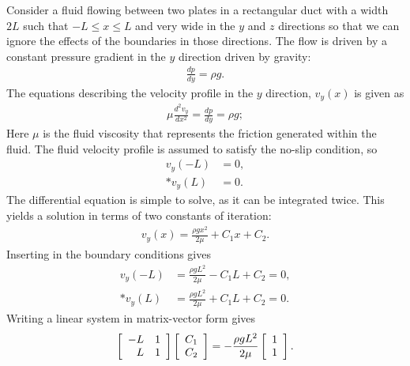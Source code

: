 Consider a fluid flowing between two plates in a rectangular duct with a width $2L$ such that $-L \le x \le L$ and very wide in the $y$ and $z$ directions so that we can ignore the effects of the boundaries in those directions. The flow is driven by a constant pressure gradient in the $y$ direction driven by gravity:
\begin{align}
  \frac{dp}{dy} = \rho g.
\end{align}
The equations describing the velocity profile in the $y$ direction, $v_y(x)$ is given as
\begin{align}
  \mu \frac{d^2 v_y}{dx^2} = \frac{dp}{dy} = \rho g;
\end{align}
Here $\mu$ is the fluid viscosity that represents the friction generated within the fluid. The fluid velocity profile is assumed to satisfy the no-slip condition, so
\begin{subequations}
\begin{align}
  v_y(-L) &= 0, \\*
  v_y(L) &= 0.
\end{align}
\end{subequations}
The differential equation is simple to solve, as it can be integrated twice. This yields a solution in terms of two constants of iteration:
\begin{align}
  v_y(x) = \frac{\rho g x^2}{2 \mu} + C_1 x + C_2.
\end{align}
Inserting in the boundary conditions gives
\begin{subequations}
\begin{align}
  v_y(-L) &= \frac{\rho g L^2}{2 \mu}  - C_1 L + C_2 = 0, \\*
  v_y(L)  &= \frac{\rho g L^2}{2 \mu} + C_1 L + C_2 = 0.
\end{align}
\end{subequations}
Writing a linear system in matrix-vector form gives
\begin{align}
  \left[ \begin{array}{r r}
  -L &  1 \\
   L &  1 \\ \end{array} \right]
   \left[ \begin{array}{c} C_1 \\ C_2 \\ \end{array} \right] =
   -\frac{\rho g L^2}{2\mu} \left[ \begin{array}{c} 1 \\ 1 \\ \end{array} \right] .
\end{align}
